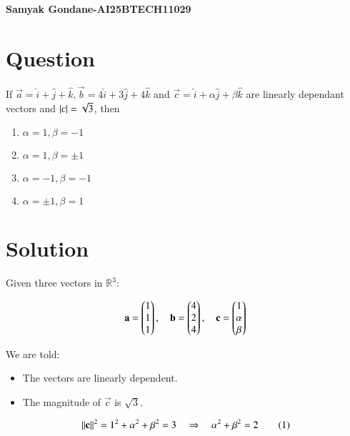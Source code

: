 \documentclass{article}
\begin{document}
\begin{center}
\large
    \textbf{Samyak Gondane-AI25BTECH11029}
\end{center}
\date{}

\section*{Question}
If $\vec{a} = \hat{i} + \hat{j} + \hat{k}, \vec{b} = 4\hat{i} + 3\hat{j} + 4\hat{k}$ and $\vec{c} = \hat{i} + \alpha\hat{j} + \beta\hat{k}$ are linearly dependant vectors and $\left\vert c\right\vert = \sqrt{3}$, then
\begin{multicols}{2}
\begin{enumerate}
    \item $\alpha = 1, \beta = -1$
    \item $\alpha = 1, \beta = \pm1$
    \item $\alpha = -1, \beta = -1$
    \item $\alpha = \pm1, \beta = 1$
\end{enumerate}
\end{multicols}

\section*{Solution}

Given three vectors in $\mathbb{R}^3$:


\begin{align}
\mathbf{a} = \begin{pmatrix}1 \\ 1 \\ 1\end{pmatrix}, \quad
\mathbf{b} = \begin{pmatrix}4 \\ 2 \\ 4\end{pmatrix}, \quad
\mathbf{c} = \begin{pmatrix}1 \\ \alpha \\ \beta\end{pmatrix}
\end{align}



We are told:
\begin{itemize}
    \item The vectors are linearly dependent.
    \item The magnitude of $\vec{c}$ is $\sqrt{3}$.
\end{itemize}



\begin{align}
\left\lVert\mathbf{c}\right\rVert^2 = 1^2 + \alpha^2 + \beta^2 = 3 \quad \Rightarrow \quad \alpha^2 + \beta^2 = 2 \tag{1}
\end{align}
\end{document}
